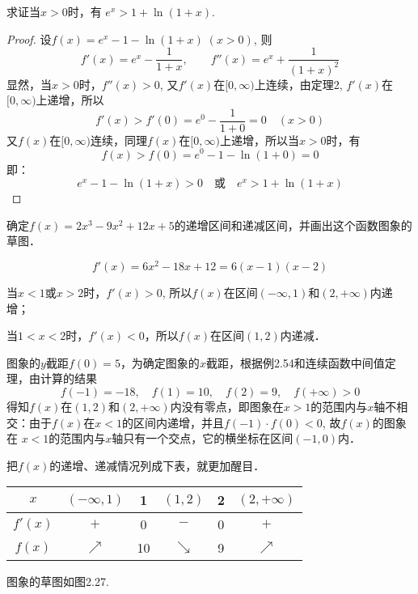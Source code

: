 \begin{example}
        求证当$x>0$时，有
$e^x> 1+\ln (1+x) $.
\end{example}


\begin{proof}
设$f(x)=e^x-1-\ln(1+x)\; (x>0)$, 则
\[f' (x) =e^x-\frac{1}{1+x},\qquad 
f''(x) =e^x +\frac{1}{(1+x)^2}\] 
    显然，当$x>0$时，$f''(x)>0$, 又$f'(x)$在$[0,\infty)$上连续，由定理2, $f'(x)$在$[0,\infty)$上递增，所以
\[f' (x) > f' (0) =e^0-\frac{1}{1+0}=0\quad  (x> 0) \]
又$f(x)$在$[0, \infty)$连续，同理$f(x)$在$[0, \infty)$上递增，所以当$x>0$时，有
\[f (x) > f (0) =e^0-1-\ln (1+0) =0\]
即：
\[e^x-1-\ln(1+x)>0\quad \text{或}\quad e^x>1+\ln(1+x)\]
\end{proof}


\begin{example}
    确定$f(x)=2x^3-9x^2+12x+5$的递增区间和递减区间，并画出这个函数图象的草图．
\end{example}


\begin{solution}
  \[  f'(x)=6x^2-18x+12=6(x-1)(x-2)\]

  当$x<1$或$x>2$时，$f'(x)>0$, 所以$f(x)$在区间$(-\infty,1)$和$(2,+\infty)$内递增；

  当$1<x<2$时，$f'(x)<0$，所以$f(x)$在区间$(1,2)$内递减．
  
  图象的$y$截距$f(0)=5$，为确定图象的$x$截距，根据例2.54和连续函数中间值定理，由计算的结果
  \[f(-1)=-18,\quad f(1)=10,\quad f(2)=9,\quad f(+\infty)>0\]
  得知$f(x)$在$(1, 2)$和$(2,+\infty)$内没有零点，即图象在$x>1$的范围内与$x$轴不相交：由于$f(x)$在$x<1$的区间内递增，并且$f(-1)\cdot f(0)<0$, 故$f(x)$的图象在
  $x<1$的范围内与$x$轴只有一个交点，它的横坐标在区间$(-1,0)$内．

  把$f(x)$的递增、递减情况列成下表，就更加醒目．

  \begin{center}
\begin{tabular}{c|ccccc}
\hline
$x$ & $(-\infty,1)$& 1& $(1,2)$ & 2& $(2,+\infty)$\\
\hline
$f'(x)$ & $+$ &0&$-$&0&$+$\\
$f(x)$ & $\nearrow$ &10&$\searrow$ &9&$\nearrow$ \\
\hline
\end{tabular}
  \end{center}
图象的草图如图2.27.

\begin{figure}[htp]
    \centering
{}
    \caption{}
\end{figure}
\end{solution}

